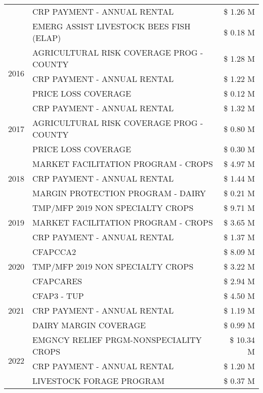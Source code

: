 \begin{tabular}{llr}
 & CRP PAYMENT - ANNUAL RENTAL & \$ 1.26 M \\
 & EMERG ASSIST LIVESTOCK BEES FISH (ELAP) & \$ 0.18 M \\
\cline{1-3}
\multirow[t]{3}{*}{2016} & AGRICULTURAL RISK COVERAGE PROG - COUNTY & \$ 1.28 M \\
 & CRP PAYMENT - ANNUAL RENTAL & \$ 1.22 M \\
 & PRICE LOSS COVERAGE & \$ 0.12 M \\
\cline{1-3}
\multirow[t]{3}{*}{2017} & CRP PAYMENT - ANNUAL RENTAL & \$ 1.32 M \\
 & AGRICULTURAL RISK COVERAGE PROG - COUNTY & \$ 0.80 M \\
 & PRICE LOSS COVERAGE & \$ 0.30 M \\
\cline{1-3}
\multirow[t]{3}{*}{2018} & MARKET FACILITATION PROGRAM - CROPS & \$ 4.97 M \\
 & CRP PAYMENT - ANNUAL RENTAL & \$ 1.44 M \\
 & MARGIN PROTECTION PROGRAM - DAIRY & \$ 0.21 M \\
\cline{1-3}
\multirow[t]{3}{*}{2019} & TMP/MFP 2019 NON SPECIALTY CROPS & \$ 9.71 M \\
 & MARKET FACILITATION PROGRAM - CROPS & \$ 3.65 M \\
 & CRP PAYMENT - ANNUAL RENTAL & \$ 1.37 M \\
\cline{1-3}
\multirow[t]{3}{*}{2020} & CFAPCCA2 & \$ 8.09 M \\
 & TMP/MFP 2019 NON SPECIALTY CROPS & \$ 3.22 M \\
 & CFAPCARES & \$ 2.94 M \\
\cline{1-3}
\multirow[t]{3}{*}{2021} & CFAP3 - TUP & \$ 4.50 M \\
 & CRP PAYMENT - ANNUAL RENTAL & \$ 1.19 M \\
 & DAIRY MARGIN COVERAGE & \$ 0.99 M \\
\cline{1-3}
\multirow[t]{3}{*}{2022} & EMGNCY RELIEF PRGM-NONSPECIALITY CROPS & \$ 10.34 M \\
 & CRP PAYMENT - ANNUAL RENTAL & \$ 1.20 M \\
 & LIVESTOCK FORAGE PROGRAM & \$ 0.37 M \\
\cline{1-3}
\bottomrule
\end{tabular}
